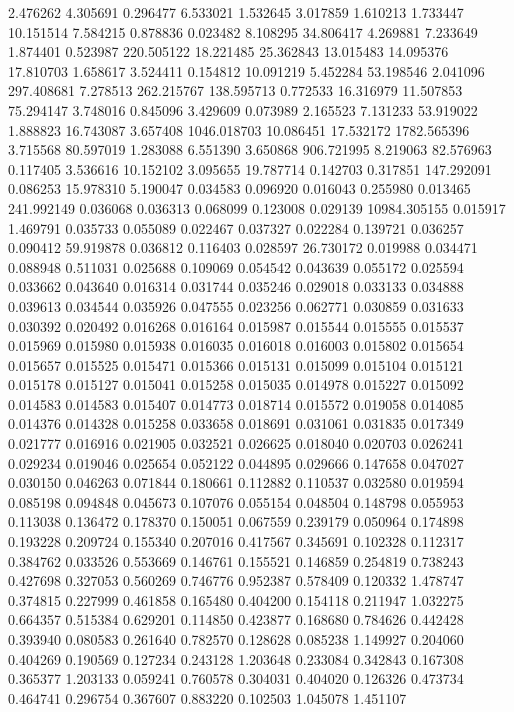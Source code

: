 2.476262
4.305691
0.296477
6.533021
1.532645
3.017859
1.610213
1.733447
10.151514
7.584215
0.878836
0.023482
8.108295
34.806417
4.269881
7.233649
1.874401
0.523987
220.505122
18.221485
25.362843
13.015483
14.095376
17.810703
1.658617
3.524411
0.154812
10.091219
5.452284
53.198546
2.041096
297.408681
7.278513
262.215767
138.595713
0.772533
16.316979
11.507853
75.294147
3.748016
0.845096
3.429609
0.073989
2.165523
7.131233
53.919022
1.888823
16.743087
3.657408
1046.018703
10.086451
17.532172
1782.565396
3.715568
80.597019
1.283088
6.551390
3.650868
906.721995
8.219063
82.576963
0.117405
3.536616
10.152102
3.095655
19.787714
0.142703
0.317851
147.292091
0.086253
15.978310
5.190047
0.034583
0.096920
0.016043
0.255980
0.013465
241.992149
0.036068
0.036313
0.068099
0.123008
0.029139
10984.305155
0.015917
1.469791
0.035733
0.055089
0.022467
0.037327
0.022284
0.139721
0.036257
0.090412
59.919878
0.036812
0.116403
0.028597
26.730172
0.019988
0.034471
0.088948
0.511031
0.025688
0.109069
0.054542
0.043639
0.055172
0.025594
0.033662
0.043640
0.016314
0.031744
0.035246
0.029018
0.033133
0.034888
0.039613
0.034544
0.035926
0.047555
0.023256
0.062771
0.030859
0.031633
0.030392
0.020492
0.016268
0.016164
0.015987
0.015544
0.015555
0.015537
0.015969
0.015980
0.015938
0.016035
0.016018
0.016003
0.015802
0.015654
0.015657
0.015525
0.015471
0.015366
0.015131
0.015099
0.015104
0.015121
0.015178
0.015127
0.015041
0.015258
0.015035
0.014978
0.015227
0.015092
0.014583
0.014583
0.015407
0.014773
0.018714
0.015572
0.019058
0.014085
0.014376
0.014328
0.015258
0.033658
0.018691
0.031061
0.031835
0.017349
0.021777
0.016916
0.021905
0.032521
0.026625
0.018040
0.020703
0.026241
0.029234
0.019046
0.025654
0.052122
0.044895
0.029666
0.147658
0.047027
0.030150
0.046263
0.071844
0.180661
0.112882
0.110537
0.032580
0.019594
0.085198
0.094848
0.045673
0.107076
0.055154
0.048504
0.148798
0.055953
0.113038
0.136472
0.178370
0.150051
0.067559
0.239179
0.050964
0.174898
0.193228
0.209724
0.155340
0.207016
0.417567
0.345691
0.102328
0.112317
0.384762
0.033526
0.553669
0.146761
0.155521
0.146859
0.254819
0.738243
0.427698
0.327053
0.560269
0.746776
0.952387
0.578409
0.120332
1.478747
0.374815
0.227999
0.461858
0.165480
0.404200
0.154118
0.211947
1.032275
0.664357
0.515384
0.629201
0.114850
0.423877
0.168680
0.784626
0.442428
0.393940
0.080583
0.261640
0.782570
0.128628
0.085238
1.149927
0.204060
0.404269
0.190569
0.127234
0.243128
1.203648
0.233084
0.342843
0.167308
0.365377
1.203133
0.059241
0.760578
0.304031
0.404020
0.126326
0.473734
0.464741
0.296754
0.367607
0.883220
0.102503
1.045078
1.451107
